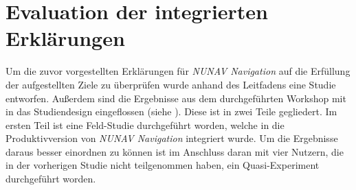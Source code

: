 \section{Evaluation der integrierten Erklärungen}

Um die zuvor vorgestellten Erklärungen für \textit{NUNAV Navigation} auf die Erfüllung der aufgestellten Ziele zu überprüfen wurde anhand des Leitfadens eine Studie entworfen. Außerdem sind die Ergebnisse aus dem durchgeführten Workshop mit in das Studiendesign eingeflossen (siehe ). Diese ist in zwei Teile gegliedert. Im ersten Teil ist eine Feld-Studie durchgeführt worden, welche in die Produktivversion von \textit{NUNAV Navigation} integriert wurde. Um die Ergebnisse daraus besser einordnen zu können ist im Anschluss daran mit vier Nutzern, die in der vorherigen Studie nicht teilgenommen haben, ein Quasi-Experiment durchgeführt worden.





